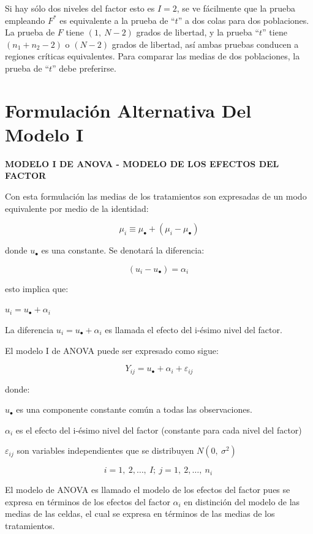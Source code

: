 \documentclass[]{book}
\theoremstyle{definition}
\theoremstyle{definition}
\theoremstyle{definition}
\theoremstyle{remark}
\begin{document}
Si hay sólo dos niveles del factor esto es \(I = 2\), se ve fácilmente
que la prueba empleando \(F^{*}\) es equivalente a la prueba de
``\(t\)'' a dos colas para dos poblaciones. La prueba de \(F\) tiene
\((1,\ N - 2)\) grados de libertad, y la prueba ``\(t\)'' tiene
\((n_1 + n_2 -2)\) o \((N-2)\) grados de libertad, así ambas pruebas
conducen a regiones críticas equivalentes. Para comparar las medias de
dos poblaciones, la prueba de ``\(t\)'' debe preferirse.

\hypertarget{formulacion-alternativa-del-modelo-i}{%
\section{Formulación Alternativa Del Modelo
I}\label{formulacion-alternativa-del-modelo-i}}

\textbf{MODELO I DE ANOVA - MODELO DE LOS EFECTOS DEL FACTOR}

Con esta formulación las medias de los tratamientos son expresadas de un
modo equivalente por medio de la identidad:

\[
\mu_{i} \equiv \mu_{\bullet} + \left( \mu_{i} - \mu_{\bullet} \right)
\]

donde \(u_{\bullet}\) es una constante. Se denotará la diferencia:

\[
(u_{i} - u_{\bullet}) = \alpha_{i}\ 
\]

esto implica que:

\(u_{i} = u_{\bullet} + \alpha_{i}\)

La diferencia \(u_{i} = u_{\bullet} + \alpha_{i}\) es llamada el efecto
del i-ésimo nivel del factor.

El modelo I de ANOVA puede ser expresado como sigue:

\[
Y_{ij} = u_{\bullet} + \alpha_{i} + \varepsilon_{ij}
\]

donde:

\(u_{\bullet}\) es una componente constante común a todas las
observaciones.

\(\alpha_{i}\) es el efecto del i-ésimo nivel del factor (constante para
cada nivel del factor)

\(\varepsilon_{ij}\) son variables independientes que se distribuyen
\(N(0,\ \sigma^{2})\)

\[
i = 1,\ 2,\ldots,\ I;\ j = 1,\ 2,\ldots,\ n_{i}\ 
\]

El modelo de ANOVA es llamado el modelo de los efectos del factor pues
se expresa en términos de los efectos del factor \(\alpha_{i}\) en
distinción del modelo de las medias de las celdas, el cual se expresa en
términos de las medias de los tratamientos.
\end{document}

